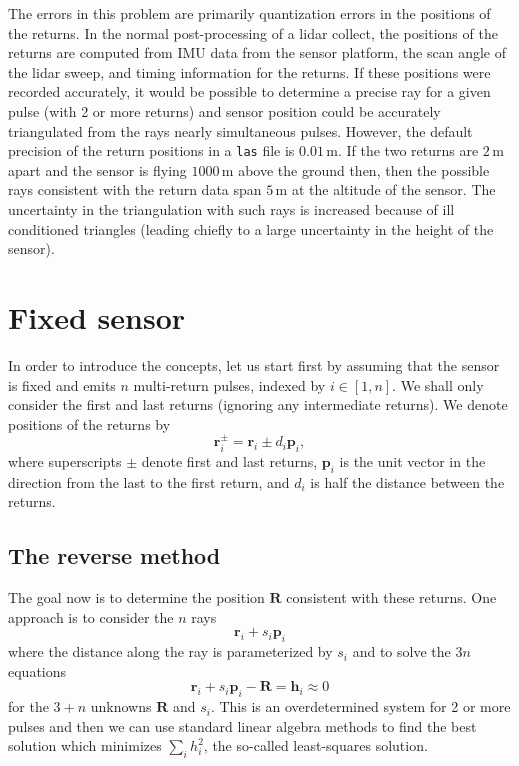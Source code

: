 \documentclass
[rmp,reprint,
twocolumn,amsmath,showkeys,letterpaper,raggedbottom]{revtex4-2}
\begin{document}
The errors in this problem are primarily quantization errors in the
positions of the returns.  In the normal post-processing of a lidar
collect, the positions of the returns are computed from IMU data from
the sensor platform, the scan angle of the lidar sweep, and timing
information for the returns.  If these positions were recorded
accurately, it would be possible to determine a precise ray for a given
pulse (with 2 or more returns) and sensor position could be accurately
triangulated from the rays nearly simultaneous pulses.  However, the
default precision of the return positions in a {\tt las} file is
$0.01\,\text{m}$.  If the two returns are $2\,\text{m}$ apart and the
sensor is flying $1000\,\text{m}$ above the ground then, then the
possible rays consistent with the return data span $5\,\text{m}$ at the
altitude of the sensor.  The uncertainty in the triangulation with such
rays is increased because of ill conditioned triangles (leading chiefly
to a large uncertainty in the height of the sensor).

\section{Fixed sensor}

In order to introduce the concepts, let us start first by assuming
that the sensor is fixed and emits $n$ multi-return pulses, indexed
by $i \in [1,n]$.  We shall only consider the first and last returns
(ignoring any intermediate returns).  We denote positions of the
returns by
\begin{equation} \label{return}
 \mathbf r_i^\pm = \mathbf r_i \pm d_i \mathbf p_i,
\end{equation}
where superscripts $\pm$ denote first and last returns, $\mathbf
p_i$ is the unit vector in the direction from the last to the first
return, and $d_i$ is half the distance between the returns.

\subsection{The reverse method}

The goal now is to determine the position $\mathbf R$ consistent
with these returns.  One approach is to consider the $n$ rays
\begin{equation}
 \mathbf r_i + s_i \mathbf p_i
\end{equation}
where the distance along the ray is parameterized by $s_i$ and to
solve the $3n$ equations
\begin{equation}
 \mathbf r_i + s_i \mathbf p_i - \mathbf R = \mathbf h_i \approx 0
\end{equation}
for the $3+n$ unknowns $\mathbf R$ and $s_i$.  This is an overdetermined
system for 2 or more pulses and then we can use standard linear algebra
methods to find the best solution which minimizes $\sum_i h_i^2$, the
so-called least-squares solution.
\end{document}
